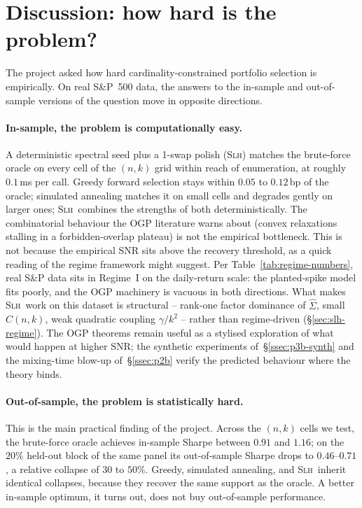 
\section{Discussion: how hard is the problem?}\label{sec:conclusion}

The project asked how hard cardinality-constrained portfolio selection is empirically.
On real S\&P~500 data, the answers to the in-sample and out-of-sample versions of the
question move in opposite directions.

\paragraph{In-sample, the problem is computationally easy.}
A deterministic spectral seed plus a 1-swap polish (\textsc{Slh}) matches the
brute-force oracle on every cell of the $(n,k)$ grid within reach of enumeration, at
roughly $0.1$\,ms per call. Greedy forward selection stays within $0.05$ to
$0.12$\,bp of the oracle; simulated annealing matches it on small cells and degrades
gently on larger ones; \textsc{Slh}\ combines the strengths of both deterministically.
The combinatorial behaviour the OGP literature warns about (convex relaxations
stalling in a forbidden-overlap plateau) is not the empirical bottleneck. This is not
because the empirical SNR sits above the recovery threshold, as a quick reading of
the regime framework might suggest. Per Table~\ref{tab:regime-numbers}, real S\&P
data sits in Regime~I on the daily-return scale: the planted-spike model fits poorly,
and the OGP machinery is vacuous in both directions. What makes \textsc{Slh}\ work on
this dataset is structural -- rank-one factor dominance of $\hat\Sigma$, small
$C(n,k)$, weak quadratic coupling $\gamma/k^2$ -- rather than regime-driven
(\S\ref{sec:slh-regime}). The OGP theorems remain useful as a stylised exploration of
what would happen at higher SNR; the synthetic experiments
of~\S\ref{ssec:p3b-synth} and the mixing-time blow-up of~\S\ref{ssec:p2b} verify the
predicted behaviour where the theory binds.

\paragraph{Out-of-sample, the problem is statistically hard.} This is the main
practical finding of the project. Across the $(n,k)$ cells we test, the brute-force
oracle achieves in-sample Sharpe between $0.91$ and $1.16$; on the $20\%$ held-out
block of the same panel its out-of-sample Sharpe drops to $0.46$--$0.71$, a relative
collapse of $30$ to $50\%$. Greedy, simulated annealing, and \textsc{Slh}\ inherit
identical collapses, because they recover the same support as the oracle. A better
in-sample optimum, it turns out, does not buy out-of-sample performance.

